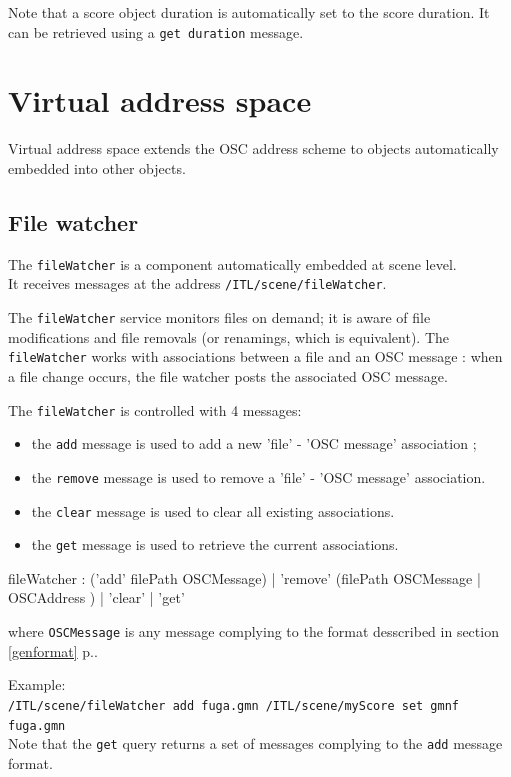 \documentclass[a4paper,twoside]{report}
\newcommand{\toplevel}[1]	{\chapter{#1}}
\newcommand{\sublevel}[1]	{\section{#1}}
\newcommand{\fullref}[1]	{\ref{#1} p.\pageref{#1}}
\newcommand{\OSC}[1]		{\texttt{#1}}
\newcommand{\example}		{\hspace*{1cm}}
\begin{document}
Note that a score object duration is automatically set to the score duration. It can be retrieved using a \OSC{get duration} message.


\toplevel{Virtual address space}

Virtual address space extends the OSC address scheme to objects automatically embedded into other objects. 

\sublevel{File watcher}
\label{watch}

The \OSC{fileWatcher} is a component automatically embedded at scene level. \\
It receives messages at the address \OSC{/ITL/scene/fileWatcher}.

The \OSC{fileWatcher} service monitors files on demand; it is aware of file modifications and file removals (or renamings, which is equivalent). The \OSC{fileWatcher} works with associations between a file and an OSC message : when a file change occurs, the file watcher posts the associated OSC message.

The \OSC{fileWatcher} is controlled with 4 messages:
\begin{itemize}
\item the \OSC{add} message is used to add a new 'file' - 'OSC message' association ;
\item the \OSC{remove} message is used to remove a 'file' - 'OSC message' association.
\item the \OSC{clear} message is used to clear all existing associations.
\item the \OSC{get} message is used to retrieve the current associations.
\end{itemize}

\begin{rail}
fileWatcher : ('add' filePath OSCMessage) 
		| 'remove' (filePath OSCMessage | OSCAddress )
		| 'clear'
		| 'get'
\end{rail}

where \OSC{OSCMessage} is any message complying to the format desscribed in section \fullref{genformat}.

Example:\\
\example \OSC{/ITL/scene/fileWatcher add fuga.gmn /ITL/scene/myScore set gmnf fuga.gmn}\\

Note that the \OSC{get} query returns a set of messages complying to the \OSC{add} message format.\\
\end{document}
